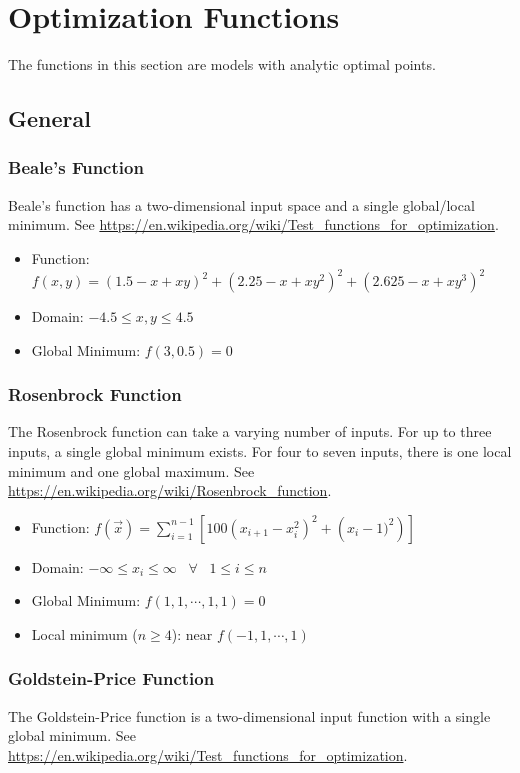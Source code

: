 \section{Optimization Functions}

The functions in this section are models with analytic optimal points.

\subsection{General}

\subsubsection{Beale's Function}
Beale's function has a two-dimensional input space and a single global/local minimum.
See \url{https://en.wikipedia.org/wiki/Test_functions_for_optimization}.

\begin{itemize}
  \item Function: $f(x,y) = (1.5-x+xy)^2+(2.25-x+xy^2)^2+(2.625-x+xy^3)^2$
  \item Domain: $-4.5 \leq x,y \leq 4.5$
  \item Global Minimum: $f(3,0.5)=0$
\end{itemize}


\subsubsection{Rosenbrock Function}
The Rosenbrock function can take a varying number of inputs.  For up to three inputs, a single global minimum
exists.  For four to seven inputs, there is one local minimum and one global maximum.
See \url{https://en.wikipedia.org/wiki/Rosenbrock_function}.

\begin{itemize}
  \item Function: $f(\vec x) = \sum_{i=1}^{n-1}\left[100\left(x_{i+1}-x_i^2\right)^2+\left(x_i-1)^2\right) \right]$
  \item Domain: $ -\infty \leq x_i \leq \infty \hspace{10pt} \forall \hspace{10pt} 1\leq i \leq n$
  \item Global Minimum: $f(1,1,\cdots,1,1)=0$
  \item Local minimum ($n\geq4$): near $f(-1,1,\cdots,1)$
\end{itemize}


\subsubsection{Goldstein-Price Function}
The Goldstein-Price function is a two-dimensional input function with a single global minimum.
See \url{https://en.wikipedia.org/wiki/Test_functions_for_optimization}.

